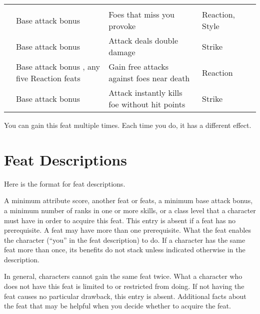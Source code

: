 {\begin{longtabu}{>{\lcol}p{10em} >{\lcol}p{15em} >{\lcol}X >{\lcol}p{6em} >{\lcol}p{3em}}
        \midrule
         &  &  &  &  \\
         & Base attack bonus  & Foes that miss you provoke & Reaction, Style&  \\
         & Base attack bonus  & Attack deals double damage & Strike &  \\
         & Base attack bonus , any five Reaction feats & Gain free attacks against foes near death & Reaction &  \\
         & Base attack bonus  & Attack instantly kills foe without hit points & Strike &  \\
    \end{longtabu}
    \begin{enumerate*}
        \item You can gain this feat multiple times. Each time you do, it has a different effect.
    \end{enumerate*}
}%

\twocolumn

\section{Feat Descriptions}
Here is the format for feat descriptions.

 A minimum attribute score, another feat or feats, a minimum base attack bonus, a minimum number of ranks in one or more skills, or a class level that a character must have in order to acquire this feat. This entry is absent if a feat has no prerequisite. A feat may have more than one prerequisite.
 What the feat enables the character (``you'' in the feat description) to do. If a character has the same feat more than once, its benefits do not stack unless indicated otherwise in the description.
\par In general, characters cannot gain the same feat twice.
 What a character who does not have this feat is limited to or restricted from doing. If not having the feat causes no particular drawback, this entry is absent.
 Additional facts about the feat that may be helpful when you decide whether to acquire the feat.

